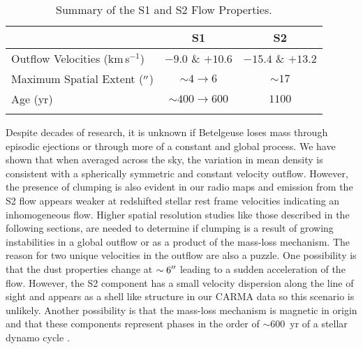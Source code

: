 \begin{table}[!hbt]
\begin{center}
\caption[Summary of the S1 and S2 Flow Properties]
{Summary of the S1 and S2 Flow Properties.}
\begin{tabular}{lcc}
\hline
\hline
\rule{0pt}{2.5ex} & S1 & S2 \\
\hline
Outflow Velocities (km\,s$^{-1}$) & $-9.0$ \& $+10.6$ & $-15.4$ \& $+13.2$ \\
Maximum Spatial Extent ($^{\prime\prime}$) & $\sim4 \rightarrow 6$ & $\sim 17$ \\
Age (yr) & $\sim 400 \rightarrow 600$ & $1100$ \\
\hline
\rule{0pt}{2.0ex}
\end{tabular}
\label{tab:5.2}
\end{center}
\end{table}
\vspace{-0.5cm}
Despite decades of research, it is unknown if Betelgeuse loses mass through episodic ejections or through more of a constant and global process. We have shown that when averaged across the sky, the variation in mean density is consistent with a spherically symmetric and constant velocity outflow. However, the presence of clumping is also evident in our radio maps and emission from the S2 flow appears weaker at redshifted stellar rest frame velocities indicating an inhomogeneous flow. Higher spatial resolution studies like those described in the following sections, are needed to determine if clumping is a result of growing instabilities in a global outflow or as a product of the mass-loss mechanism. The reason for two unique velocities in the outflow are also a puzzle. One possibility is that the dust properties change at $\sim 6^{\prime\prime}$ leading to a sudden acceleration of the flow. However, the S2 component has a small velocity dispersion along the line of sight \citep{bernat_1979} and appears as a shell like structure in our CARMA data so this scenario is unlikely. Another possibility is that the mass-loss mechanism is magnetic in origin and that these components represent phases in the order of $\sim 600$\, yr of a stellar dynamo cycle \citep{harper_2013b}. 

